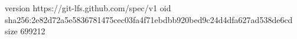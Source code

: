 version https://git-lfs.github.com/spec/v1
oid sha256:2e82d72a5e5836781475cec03fa4f71ebdbb920bed9c24d4dfa627ad538de6cd
size 699212
